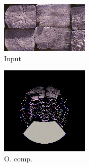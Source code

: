 \begin{figure}[]
\begin{subfigure}{\textwidth}
        \begin{subfigure}{0.19\textwidth}
            \centering
            \includegraphics[width=\textwidth]{images/04-experiment03/ball_beams_target.jpg}
            \caption*{Input}
        \end{subfigure}
        \hfill
        \begin{subfigure}{0.19\textwidth}
            \centering
            \includegraphics[width=\textwidth]{images/04-experiment03/ball/beams/stats_im.jpg}
            \caption*{O. comp.}
        \end{subfigure}
        \hfill
        \begin{subfigure}{0.19\textwidth}

\end{subfigure}
\end{subfigure}
\end{figure}
